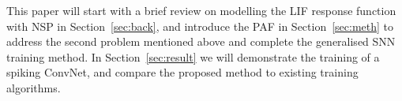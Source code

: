 \documentclass[10pt,journal,compsoc]{IEEEtran}
\begin{document}
	
	
	This paper will start with a brief review on modelling the LIF response function with NSP in Section~\ref{sec:back}, and introduce the PAF in Section~\ref{sec:meth} to address the second problem mentioned above and complete the generalised SNN training method.
	In Section~\ref{sec:result} we will demonstrate the training of a spiking ConvNet, and compare the proposed method to existing training algorithms.





%
%

\end{document}
